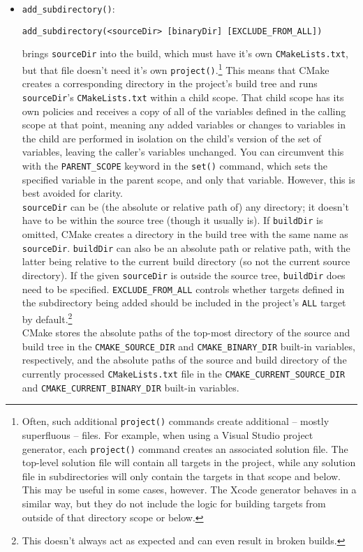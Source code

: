 \documentclass[8pt, table, xcdraw]{article}%
\begin{document}
\begin{itemize}
\item \lstinline{add_subdirectory()}:

\begin{lstlisting}
add_subdirectory(<sourceDir> [binaryDir] [EXCLUDE_FROM_ALL])
\end{lstlisting}

brings \lstinline{sourceDir} into the build, which must have it's own \lstinline{CMakeLists.txt}, but that file doesn't need it's own \lstinline{project()}.\footnote{Often, such additional \lstinline{project()} commands create additional -- mostly superfluous -- files. For example, when using a Visual Studio project generator, each \lstinline{project()} command creates an associated solution file. The top-level solution file will contain all targets in the project, while any solution file in subdirectories will only contain the targets in that scope and below. This may be useful in some cases, however. The Xcode generator behaves in a similar way, but they do not include the logic for building targets from outside of that directory scope or below.} This means that CMake creates a corresponding directory in the project’s build tree and runs \lstinline{sourceDir}'s \lstinline{CMakeLists.txt} within a child scope. That child scope has its own policies and receives a copy of all of the variables defined in the calling scope at that point, meaning any added variables or changes to variables in the child are performed in isolation on the child’s version of the set of variables, leaving the caller’s variables unchanged. You can circumvent this with the \lstinline{PARENT_SCOPE} keyword in the \lstinline{set()} command, which sets the specified variable in the parent scope, and only that variable. However, this is best avoided for clarity.\\
\lstinline{sourceDir} can be (the absolute or relative path of) any directory; it doesn't have to be within the source tree (though it usually is). If \lstinline{buildDir} is omitted, CMake creates a directory in the build tree with the same name as \lstinline{sourceDir}. \lstinline{buildDir} can also be an absolute path or relative path, with the latter being relative to the current build directory (so not the current source directory). If the given \lstinline{sourceDir} is outside the source tree, \lstinline{buildDir} does need to be specified. \lstinline{EXCLUDE_FROM_ALL} controls whether targets defined in the subdirectory being added should be included in the project’s \lstinline{ALL} target by default.\footnote{This doesn’t always act as expected and can even result in broken builds.}\\
CMake stores the absolute paths of the top-most directory of the source and build tree in the \lstinline{CMAKE_SOURCE_DIR} and \lstinline{CMAKE_BINARY_DIR} built-in variables, respectively, and the absolute paths of the source and build directory of the currently processed \lstinline{CMakeLists.txt} file in the \lstinline{CMAKE_CURRENT_SOURCE_DIR} and \lstinline{CMAKE_CURRENT_BINARY_DIR} built-in variables.


\end{itemize}
\end{document}
